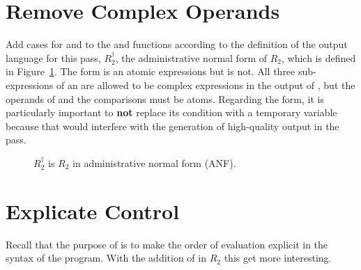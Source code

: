 \documentclass[11pt]{book}
\newcommand{\gray}[1]{{\color{gray} #1}}
\begin{document}
\clearpage

\section{Remove Complex Operands}
\label{sec:remove-complex-opera-R2}

Add cases for  and  to the  and
 functions according to the definition of the output
language for this pass, $R_2^{\dagger}$, the administrative normal
form of $R_2$, which is defined in Figure~\ref{fig:r2-anf-syntax}. The
 form is an atomic expressions but  is not. All
three sub-expressions of an  are allowed to be complex
expressions in the output of , but the
operands of  and the comparisons must be atoms.  Regarding
the  form, it is particularly important to \textbf{not}
replace its condition with a temporary variable because that would
interfere with the generation of high-quality output in the
 pass.


\begin{figure}[tp]
\centering
\fbox{
\begin{minipage}{0.96\textwidth}
\[
\begin{array}{rcl}
\Atm &::=& \gray{ \INT{\Int} \mid \VAR{\Var} } \mid \BOOL{\itm{bool}}\\
\Exp &::=& \gray{ \Atm \mid \READ{} } \\
     &\mid& \gray{ \NEG{\Atm} \mid \ADD{\Atm}{\Atm} } \\
     &\mid& \gray{ \LET{\Var}{\Exp}{\Exp} } \\
     &\mid& \UNIOP{\key{'not}}{\Atm} \\
      &\mid& \BINOP{\itm{cmp}}{\Atm}{\Atm} \mid \IF{\Exp}{\Exp}{\Exp} \\
R^{\dagger}_2  &::=& \PROGRAM{\code{'()}}{\Exp}
\end{array}
\]
\end{minipage}
}
\caption{$R_2^{\dagger}$ is $R_2$ in administrative normal form (ANF).}
\label{fig:r2-anf-syntax}
\end{figure}


\section{Explicate Control}
\label{sec:explicate-control-r2}

Recall that the purpose of  is to make the
order of evaluation explicit in the syntax of the program.  With the
addition of  in $R_2$ this get more interesting.
\end{document}
